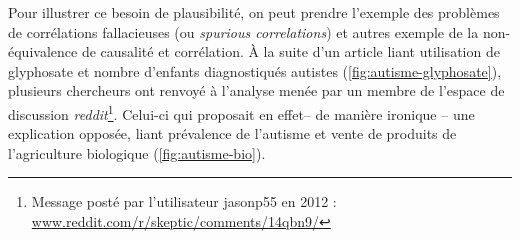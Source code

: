 Pour illustrer ce besoin de \og plausibilité\fg{}, on peut prendre l'exemple des problèmes de corrélations fallacieuses (ou \og \textit{spurious correlations}\fg{}) et autres exemple de la non-équivalence de causalité et corrélation.
À la suite d'un article \autocite{shaw_elevated_2017} liant utilisation de glyphosate et nombre d'enfants diagnostiqués autistes (\cref{fig:autisme-glyphosate}), plusieurs chercheurs ont renvoyé à l'analyse menée par un membre de l'espace de discussion \textit{reddit}\footnote{
Message posté par l'utilisateur \og jasonp55\fg{} en 2012 : \\ \href{https://www.reddit.com/r/skeptic/comments/14qbn9/rskeptic_i_was_practicing_graphpad_and_i_think_i/}{www.reddit.com/r/skeptic/comments/14qbn9/}
}.
Celui-ci qui proposait en effet-- de manière ironique -- une explication opposée, liant prévalence de l'autisme et vente de produits de  l'agriculture biologique (\cref{fig:autisme-bio}).

